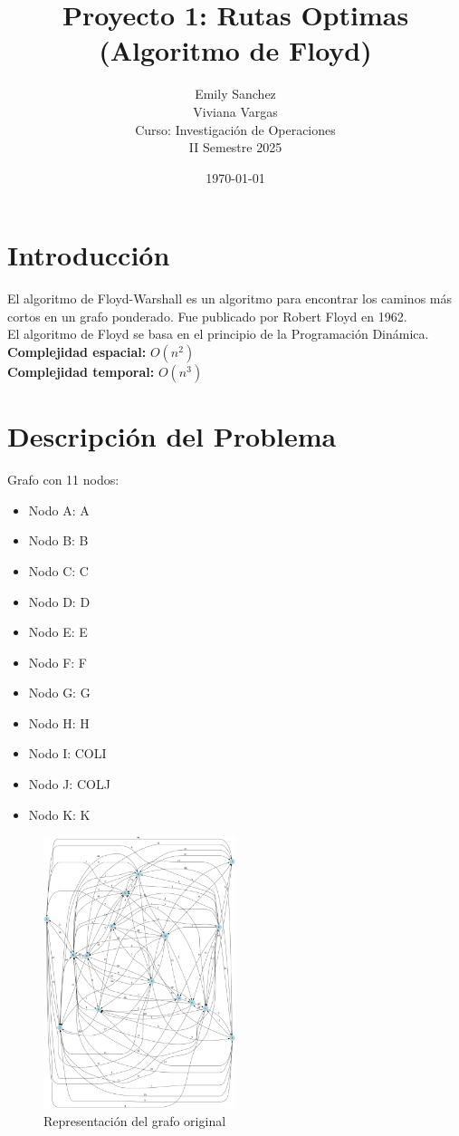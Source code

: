 \documentclass[12pt]{article}
\title{Proyecto 1: Rutas Optimas (Algoritmo de Floyd)}
\author{Emily Sanchez \\ Viviana Vargas \\[1cm] Curso: Investigación de Operaciones \\ II Semestre 2025}
\date{\today}
\begin{document}
\maketitle
\thispagestyle{empty}
\newpage
\setcounter{page}{1}

\section{Introducción}
El algoritmo de Floyd-Warshall es un algoritmo para encontrar los caminos más cortos en un grafo ponderado. Fue publicado por Robert Floyd en 1962.\\
El algoritmo de Floyd se basa en el principio de la Programación Dinámica.\\
\textbf{Complejidad espacial:} $O(n^2)$\\
\textbf{Complejidad temporal:} $O(n^3)$\\
\clearpage
\section{Descripción del Problema}
Grafo con 11 nodos:

\begin{itemize}
\item Nodo A: A
\item Nodo B: B
\item Nodo C: C
\item Nodo D: D
\item Nodo E: E
\item Nodo F: F
\item Nodo G: G
\item Nodo H: H
\item Nodo I: COLI
\item Nodo J: COLJ
\item Nodo K: K
\end{itemize}

\begin{figure}[h!]
\centering
\includegraphics[width=0.5\textwidth,keepaspectratio]{grafo.png}
\caption{Representación del grafo original}
\end{figure}
\end{document}

